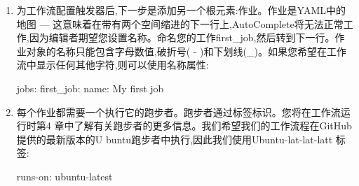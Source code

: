 \begin{enumerate}
如果您在第一个元素之后添加逗号,然后再次单击“控制+空间,则可以从AutoComp lete中选择其他元素(请参见图1.11):


每个触发器都是地图,可以包含其他参数。如果将光标放在下面的线路上:添加两个空间缩进,AutoComplete将为您提供完整YAML语法的结果。它还将为您提供可用于配置每个触发的属性(请参见图1.12):


请注意,大多数参数(例如,分支或路径)是序列,如果您不使用JSON语法,则每个条目都需要破折号。

我们希望我们的测试工作流程在每次推动到主分支上运行。我们还希望能够手动触发它(请参阅触发工作流程的事件)。您的触发器工作流程代码应该看起来像这样:

\begin{shell}
on:
  push:
    branches:
      - main
  workflow_dispatch:
\end{shell}

\begin{myNotic}{通配符}
*可以用作路径中的通配符,而**则可以用作递归通配符。 *是YAML中的特殊角色,因此您需要在这种情况下使用引号:

\begin{shell}
push:
  branches:
    - 'release/**'
  paths:
    - 'doc/**'
\end{shell}
\end{myNotic}

\item 
为工作流配置触发器后,下一步是添加另一个根元素:作业。作业是YAML中的地图  ---  这意味着在带有两个空间缩进的下一行上,AutoComplete将无法正常工作,因为编辑者期望您设置名称。命名您的工作first\_job,然后转到下一行。作业对象的名称只能包含字母数值,破折号( - )和下划线(\_)。如果您希望在工作流中显示任何其他字符,则可以使用名称属性:

\begin{shell}
jobs:
  first_job:
    name: My first job
\end{shell}

\item 
每个作业都需要一个执行它的跑步者。跑步者通过标签标识。您将在工作流运行时第4 章中了解有关跑步者的更多信息。我们希望我们的工作流程在GitHub提供的最新版本的U buntu跑步者中执行,因此我们使用Ubuntu-lat-lat-latt 标签:

\begin{shell}
runs-on: ubuntu-latest
\end{shell}


\end{enumerate}
